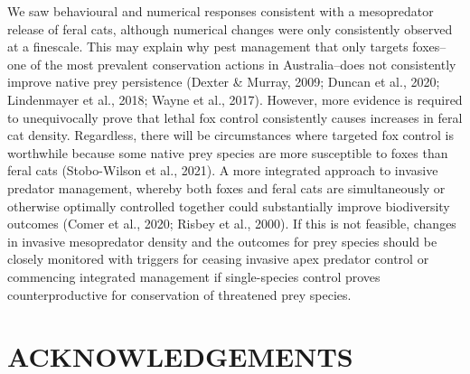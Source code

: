\documentclass[]{elsarticle} %
\begin{document}
We saw behavioural and numerical responses consistent with a mesopredator release of feral cats, although numerical changes were only consistently observed at a finescale. This may explain why pest management that only targets foxes--one of the most prevalent conservation actions in Australia--does not consistently improve native prey persistence (Dexter \& Murray, 2009; Duncan et al., 2020; Lindenmayer et al., 2018; Wayne et al., 2017). However, more evidence is required to unequivocally prove that lethal fox control consistently causes increases in feral cat density. Regardless, there will be circumstances where targeted fox control is worthwhile because some native prey species are more susceptible to foxes than feral cats (Stobo-Wilson et al., 2021). A more integrated approach to invasive predator management, whereby both foxes and feral cats are simultaneously or otherwise optimally controlled together could substantially improve biodiversity outcomes (Comer et al., 2020; Risbey et al., 2000). If this is not feasible, changes in invasive mesopredator density and the outcomes for prey species should be closely monitored with triggers for ceasing invasive apex predator control or commencing integrated management if single-species control proves counterproductive for conservation of threatened prey species.

\newpage

\hypertarget{acknowledgements}{%
\section{ACKNOWLEDGEMENTS}\label{acknowledgements}}
\end{document}
